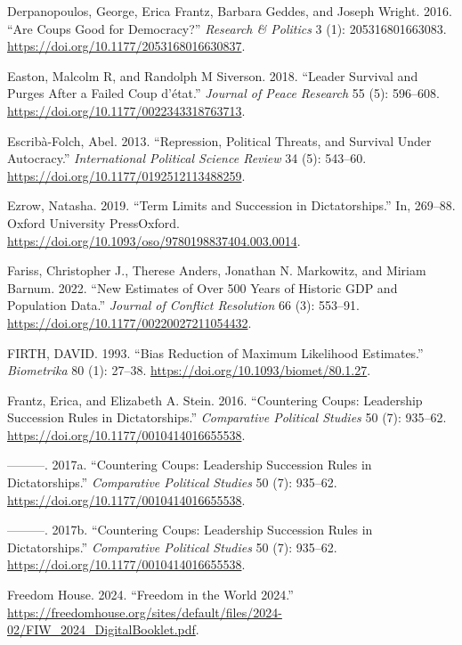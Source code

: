 \documentclass[
  12pt,
]{report}
\newlength{\cslhangindent}
\newenvironment{CSLReferences}[2] %
 {\begin{list}{}{%
  \setlength{\itemindent}{0pt}
  \setlength{\leftmargin}{0pt}
  \setlength{\parsep}{0pt}
  \ifodd #1
   \setlength{\leftmargin}{\cslhangindent}
   \setlength{\itemindent}{-1\cslhangindent}
  \fi
  \setlength{\itemsep}{#2\baselineskip}}}
 {\end{list}}
\begin{document}
\begin{CSLReferences}{1}{0}
Derpanopoulos, George, Erica Frantz, Barbara Geddes, and Joseph Wright.
2016. {``Are Coups Good for Democracy?''} \emph{Research \& Politics} 3
(1): 205316801663083. \url{https://doi.org/10.1177/2053168016630837}.

Easton, Malcolm R, and Randolph M Siverson. 2018. {``Leader Survival and
Purges After a Failed Coup d{'}état.''} \emph{Journal of Peace Research}
55 (5): 596--608. \url{https://doi.org/10.1177/0022343318763713}.

Escribà-Folch, Abel. 2013. {``Repression, Political Threats, and
Survival Under Autocracy.''} \emph{International Political Science
Review} 34 (5): 543--60. \url{https://doi.org/10.1177/0192512113488259}.

Ezrow, Natasha. 2019. {``Term Limits and Succession in Dictatorships.''}
In, 269--88. Oxford University PressOxford.
\url{https://doi.org/10.1093/oso/9780198837404.003.0014}.

Fariss, Christopher J., Therese Anders, Jonathan N. Markowitz, and
Miriam Barnum. 2022. {``New Estimates of Over 500 Years of Historic GDP
and Population Data.''} \emph{Journal of Conflict Resolution} 66 (3):
553--91. \url{https://doi.org/10.1177/00220027211054432}.

FIRTH, DAVID. 1993. {``Bias Reduction of Maximum Likelihood
Estimates.''} \emph{Biometrika} 80 (1): 27--38.
\url{https://doi.org/10.1093/biomet/80.1.27}.

Frantz, Erica, and Elizabeth A. Stein. 2016. {``Countering Coups:
Leadership Succession Rules in Dictatorships.''} \emph{Comparative
Political Studies} 50 (7): 935--62.
\url{https://doi.org/10.1177/0010414016655538}.

---------. 2017a. {``Countering Coups: Leadership Succession Rules in
Dictatorships.''} \emph{Comparative Political Studies} 50 (7): 935--62.
\url{https://doi.org/10.1177/0010414016655538}.

---------. 2017b. {``Countering Coups: Leadership Succession Rules in
Dictatorships.''} \emph{Comparative Political Studies} 50 (7): 935--62.
\url{https://doi.org/10.1177/0010414016655538}.

Freedom House. 2024. {``Freedom in the World 2024.''}
\url{https://freedomhouse.org/sites/default/files/2024-02/FIW_2024_DigitalBooklet.pdf}.


\end{CSLReferences}
\end{document}
